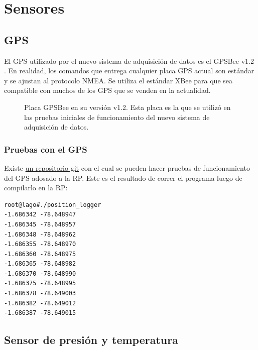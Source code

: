\documentclass[a4paper,11pt]{article}
\begin{document}
\section{Sensores}
\subsection{GPS}
El GPS utilizado por el nuevo sistema de adquisición de datos es el GPSBee v1.2
\cite{bibGPSBee}.
En realidad, los comandos que entrega cualquier placa GPS actual son estándar y
se ajustan al protocolo NMEA. 
Se utiliza el estándar XBee para que sea compatible con muchos de los GPS que se
venden en la actualidad.

\begin{figure}[!h]
  \centering
  \caption{Placa GPSBee en su versión v1.2. Esta placa es la que se utilizó en
las pruebas iniciales de funcionamiento del nuevo sistema de adquisición de
datos.}
  \label{fig:gpsbee}
\end{figure}

\subsubsection{Pruebas con el GPS}
Existe \href{https://github.com/lagoprojectrp/rp\_venusGps}{un repositorio
git} con el cual se pueden hacer pruebas de funcionamiento del GPS adosado a la
RP. Este es el resultado de correr el programa luego de compilarlo en la RP:
\begin{verbatim}
root@lago#./position_logger
-1.686342 -78.648947
-1.686345 -78.648957
-1.686348 -78.648962
-1.686355 -78.648970
-1.686360 -78.648975
-1.686365 -78.648982
-1.686370 -78.648990
-1.686375 -78.648995
-1.686378 -78.649003
-1.686382 -78.649012
-1.686387 -78.649015
\end{verbatim}

\subsection{Sensor de presión y temperatura}
\end{document}
